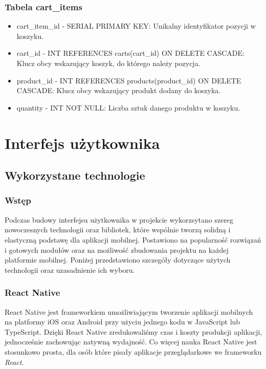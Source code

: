 \subsubsection{Tabela cart\_items}
\begin{itemize}
\item cart\_item\_id - SERIAL PRIMARY KEY: Unikalny identyfikator pozycji w koszyku.
\item cart\_id - INT REFERENCES carts(cart\_id) ON DELETE CASCADE: Klucz obcy wskazujący koszyk, do którego należy pozycja.
\item product\_id - INT REFERENCES products(product\_id) ON DELETE CASCADE: Klucz obcy wskazujący produkt dodany do koszyka.
\item quantity - INT NOT NULL: Liczba sztuk danego produktu w koszyku.
\end{itemize}

\section{Interfejs użytkownika}

\subsection{Wykorzystane technologie}

\subsubsection{Wstęp}

Podczas budowy interfejsu użytkownika w projekcie wykorzsytano szereg nowoczesnych technologii oraz bibliotek, które wspólnie tworzą solidną i elastyczną podstawę dla aplikacji mobilnej. Postawiono na popularność rozwiązań i gotowych modułów oraz na możliwość zbudowania projektu na każdej platformie mobilnej. Poniżej przedstawiono szczegóły dotyczące użytych technologii oraz uzasadnienie ich wyboru.

\subsubsection{React Native}

React Native jest frameworkiem umożliwiającym tworzenie aplikacji mobilnych na platformy iOS oraz Android przy użyciu jednego kodu w JavaScript lub TypeScript. Dzięki React Native zredukowaliśmy czas i koszty produkcji aplikacji, jednocześnie zachowując natywną wydajność. Co więcej nauka React Native jest stosunkowo prosta, dla osób które pisały aplikacje przeglądarkowe we frameworku \textit{React}.

